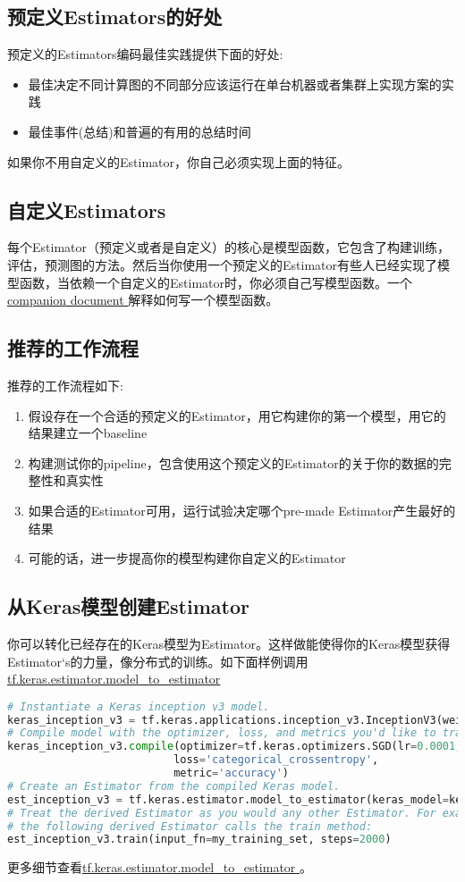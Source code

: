 \subsection{预定义Estimators的好处}
预定义的Estimators编码最佳实践提供下面的好处:
\begin{itemize}
\item 最佳决定不同计算图的不同部分应该运行在单台机器或者集群上实现方案的实践
\item 最佳事件(总结)和普遍的有用的总结时间
\end{itemize}
如果你不用自定义的Estimator，你自己必须实现上面的特征。
\subsection{自定义Estimators}
每个Estimator（预定义或者是自定义）的核心是模型函数，它包含了构建训练，评估，预测图的方法。然后当你使用一个预定义的Estimator有些人已经实现了模型函数，当依赖一个自定义的Estimator时，你必须自己写模型函数。一个\href{https://www.tensorflow.org/extend/estimators?hl=zh-cn}{ companion document }解释如何写一个模型函数。
\subsection{推荐的工作流程}
推荐的工作流程如下:
\begin{enumerate}
\item 假设存在一个合适的预定义的Estimator，用它构建你的第一个模型，用它的结果建立一个baseline
\item 构建测试你的pipeline，包含使用这个预定义的Estimator的关于你的数据的完整性和真实性
\item 如果合适的Estimator可用，运行试验决定哪个pre-made Estimator产生最好的结果
\item 可能的话，进一步提高你的模型构建你自定义的Estimator
\end{enumerate}
\subsection{从Keras模型创建Estimator}
你可以转化已经存在的Keras模型为Estimator。这样做能使得你的Keras模型获得Estimator‘s的力量，像分布式的训练。如下面样例调用\href{https://www.tensorflow.org/api_docs/python/tf/keras/estimator/model_to_estimator?hl=zh-cn}{ tf.keras.estimator.model\_to\_estimator}
\begin{lstlisting}[language=Python]
# Instantiate a Keras inception v3 model.
keras_inception_v3 = tf.keras.applications.inception_v3.InceptionV3(weights=None)
# Compile model with the optimizer, loss, and metrics you'd like to train with.
keras_inception_v3.compile(optimizer=tf.keras.optimizers.SGD(lr=0.0001, momentum=0.9),
                          loss='categorical_crossentropy',
                          metric='accuracy')
# Create an Estimator from the compiled Keras model.
est_inception_v3 = tf.keras.estimator.model_to_estimator(keras_model=keras_inception_v3)
# Treat the derived Estimator as you would any other Estimator. For example,
# the following derived Estimator calls the train method:
est_inception_v3.train(input_fn=my_training_set, steps=2000)
\end{lstlisting}
更多细节查看\href{https://www.tensorflow.org/api_docs/python/tf/keras/estimator/model_to_estimator?hl=zh-cn}{tf.keras.estimator.model\_to\_estimator }。
